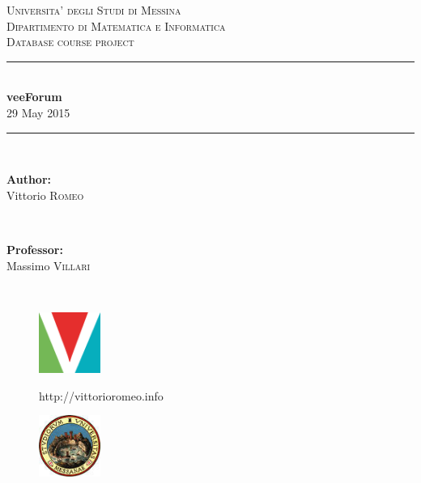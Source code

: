 \documentclass[12pt]{report}
\newcommand{\HRule}{\rule{\linewidth}{0.5mm}}
\renewcommand\emph{\textbf}
\begin{document}
    \begin{titlepage}

        \center

        \textsc{\LARGE Universita' degli Studi di Messina}\\[0.1cm]
        \textsc{\Large Dipartimento di Matematica e Informatica}\\[0.5cm]
        \textsc{\Large Database course project}\\[0.5cm]

        \HRule \\[0.4cm]
        { \huge \bfseries veeForum}\\[0.1cm]

        {\large 29 May 2015}
        \HRule \\[1.5cm]

        \begin{minipage}{0.4\textwidth}
        \begin{flushleft} \large
        \emph{Author:}\\
        Vittorio \textsc{Romeo}
        \end{flushleft}
        \end{minipage}
        ~
        \begin{minipage}{0.4\textwidth}
        \begin{flushright} \large
        \emph{Professor:} \\
        Massimo \textsc{Villari}


        \end{flushright}
        \end{minipage}\\[4cm]

        \vfill

        \begin{minipage}{\linewidth}
            \centering
            \begin{minipage}{0.35\linewidth}
                \begin{figure}[H]
                    \center
                    \includegraphics[width=2cm, height=2cm]{logovee}

                    http://vittorioromeo.info
                \end{figure}
            \end{minipage}
            \hspace{0.27\linewidth}
            \begin{minipage}{0.35\linewidth}
                \begin{figure}[H]
                    \center
                    \includegraphics[width=2cm, height=2cm]{logounime}


\end{figure}
\end{minipage}
\end{minipage}
\end{titlepage}
\end{document}
